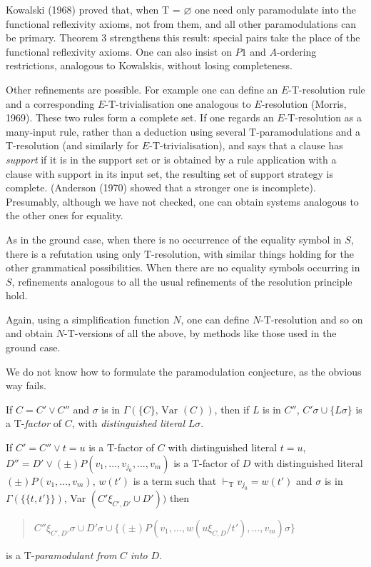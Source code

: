\documentclass[letterpaper]{report}
\begin{document}
Kowalski (1968) proved that, when T = $\varnothing$ one need only
paramodulate into the functional reflexivity axioms, not from them, and
all other paramodulations can be primary. Theorem 3 strengthens this
result: special pairs take the place of the functional reflexivity
axioms. One can also insist on $P1$ and $A$-ordering restrictions,
analogous to Kowalski\textquotesingle s, without losing completeness.

Other refinements are possible. For example one can define an
$E$-T-resolution rule and a corresponding $E$-$\mathrm{T}$-trivialisation one
analogous to $E$-resolution (Morris, 1969). These two rules form a
complete set. If one regards an $E$-T-resolution as a many-input rule,
rather than a deduction using several $\mathrm{T}$-paramodulations and a
T-resolution (and similarly for $E$-$\mathrm{T}$-trivialisation), and says that a
clause has \emph{support} if it is in the support set or is obtained by
a rule application with a clause with support in its input set, the
resulting set of support strategy is complete. (Anderson (1970) showed
that a stronger one is incomplete). Presumably, although we have not
checked, one can obtain systems analogous to the other ones for
equality.

As in the ground case, when there is no occurrence of the equality
symbol in $S$, there is a refutation using only $\mathrm{T}$-resolution, with
similar things holding for the other grammatical possibilities. When
there are no equality symbols occurring in $S$, refinements analogous
to all the usual refinements of the resolution principle hold.

Again, using a simplification function $N$, one can define
$N$-$\mathrm{T}$-resolution and so on and obtain $N$-$\mathrm{T}$-versions of all the
above, by methods like those used in the ground case.

We do not know how to formulate the paramodulation conjecture, as the
obvious way fails.

If $C=C'\lor C''$ and $\sigma$ is in
$\Gamma(\{C\},\,\mbox{Var}\,\,(C))$, then if $L$ is in
$C''$, $C'\sigma\cup\{L\sigma\}$ is a $\mathrm{T}$-\emph{factor}
of $C$, with \emph{distinguished literal} $L\sigma$.

If $C'=C''\lor t=u$ is a $\mathrm{T}$-factor of $C$ with
distinguished literal $t=u$,
$D''=D'\vee(\pm)P(v_{1},\ldots,v_{j_{0}},\ldots,v_{m})$
is a $\mathrm{T}$-factor of $D$ with distinguished literal
$(\pm)P(v_{1},\ldots,v_{m})$, $w(t')$ is a term such that
$\vdash_{\mathrm{T}}v_{j_{0}}=w(t')$ and $\sigma$ is in
$\Gamma(\{\{t,t'\}\})$, Var
$(C'\xi_{C',D'}\cup D'))$ then
\begin{quote}
$C''\xi_{C',D'}\sigma\cup D'\sigma\cup\{(\pm)P(v_ {1},\ldots,w(u\xi_{C,D}/t'),\ldots,v_{m})\sigma\}$
\end{quote}
is a $\mathrm{T}$-\emph{paramodulant from} $C$ \emph{into} $D$.
\end{document}

